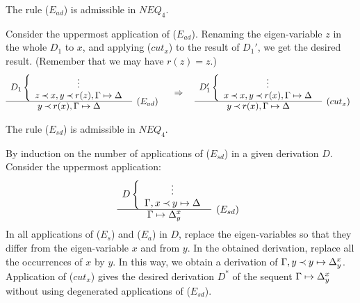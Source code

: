 \begin{LEMMA}\label{le:noEad}
The rule ($E_{ad}$) is admissible in $NEQ_4$.
\end{LEMMA}
\begin{PROOF}
Consider the uppermost application of ($E_{ad}$).
Renaming the eigen-variable $z$ in the whole $D_1$ to $x$, and applying ($cut_x$)
to the result of $D_1'$, we get the desired result. (Remember that we may have $r(z)=z$.)
\[ \begin{array}{cl}
D_1 \left \{ \begin{array}{c}
 \vdots \\
 z\Incl x, y\Incl r(z), \Gamma\Seq\Delta \end{array} \right . \\ \cline{1-1}
 y \Incl r(x), \Gamma\Seq\Delta & \raisebox{1.2ex}[1.5ex][0ex]{$(E_{ad})$}
\end{array} 
\conv
\begin{array}{cl}
D_1' \left \{ \begin{array}{c}
 \vdots \\
 x\Incl x, y\Incl r(x), \Gamma\Seq\Delta \end{array} \right . \\ \cline{1-1}
 y \Incl r(x), \Gamma\Seq\Delta & \raisebox{1.2ex}[1.5ex][0ex]{$(cut_x)$}
\end{array} \]
\end{PROOF}
%
\begin{LEMMA}\label{le:noEsd} 
The rule ($E_{sd}$) is admissible in $NEQ_4$.
\end{LEMMA}
\begin{PROOF}
By induction on the number of applications of ($E_{sd}$) in a given
derivation $D$. Consider the uppermost application:
\[ \begin{array}{cl}
D\left\{ \begin{array}{c}
 \vdots \\
 \Gamma,x\Incl y\Seq\Delta \end{array} \right. \\ \cline{1-1}
 \Gamma\Seq\Delta_y^x  &  \raisebox{1.2ex}[1.5ex][0ex]{($E_{sd}$)}
\end{array} \]
In all applications of ($E_s$) and ($E_a$) in $D$, replace the
eigen-variables so that they differ from the eigen-variable $x$ and from $y$. 
In the obtained
derivation, replace all the occurrences of $x$ by $y$. In this way, we 
obtain a derivation of $\Gamma,y\mathbin{\prec} y\mathrel{\mapsto}\Delta_y^x$. 
Application of ($cut_x$) gives the desired derivation $D^*$ of the
sequent $\Gamma\mathrel{\mapsto}\Delta_y^x$ 
without using degenerated applications of ($E_{sd}$).
\end{PROOF}

